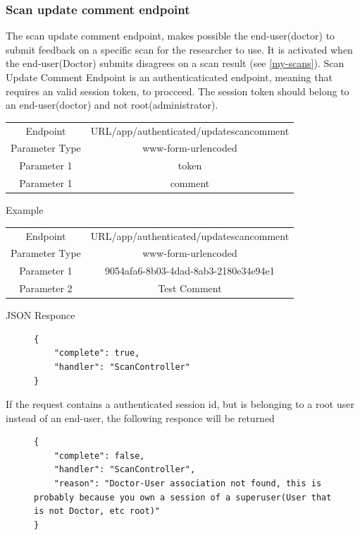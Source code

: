 				\subsubsection{Scan update comment endpoint}
					The scan update comment endpoint, makes possible the end-user(doctor) to submit feedback on a specific scan for the 
					researcher to use. It is activated when the end-user(Doctor) submits disagrees on a scan result (see \ref{my-scans}). 
					Scan Update Comment Endpoint is an authenticaticated endpoint, meaning that requires an valid session token, to procceed. 
					The session token should belong to an end-user(doctor) and not root(administrator).
					\begin{center}
						\begin{tabular}{ |c|c| } 
							\hline
							Endpoint & {{URL}}/app/authenticated/updatescancomment\\
							Parameter Type & www-form-urlencoded  \\
							Parameter 1 & token  \\
							Parameter 1 & comment  \\
							\hline
						\end{tabular}
					\end{center}
					Example
					\begin{center}
						\begin{tabular}{ |c|c| } 
							\hline
							Endpoint & {{URL}}/app/authenticated/updatescancomment\\
							Parameter Type & www-form-urlencoded  \\
							Parameter 1 & 9054afa6-8b03-4dad-8ab3-2180e34e94e1  \\
							Parameter 2 & Test Comment  \\
							\hline
						\end{tabular}
					\end{center}
					JSON Responce
					\begin{figure}[H]
						\iftrue
						\begin{lstlisting}[]
{
	"complete": true,
	"handler": "ScanController"
}
						\end{lstlisting}
					\end{figure}
					If the request contains a authenticated session id, but is belonging to a root user instead of an end-user, the
					following responce will be returned
					\begin{figure}[H]
						\iftrue
						\begin{lstlisting}[]
{	
	"complete": false,
	"handler": "ScanController",
	"reason": "Doctor-User association not found, this is probably because you own a session of a superuser(User that is not Doctor, etc root)"
}
						\end{lstlisting}
					\end{figure}
